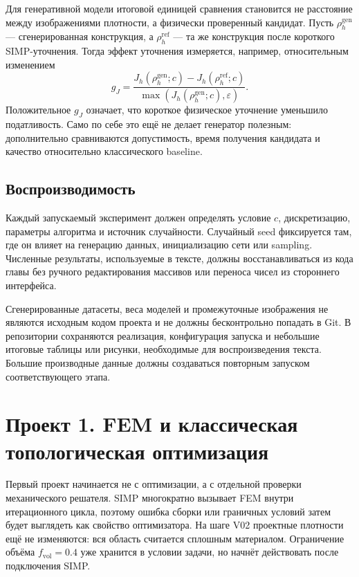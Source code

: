 Для генеративной модели итоговой единицей сравнения становится не расстояние между изображениями плотности, а физически проверенный кандидат. Пусть $\rho_h^{\mathrm{gen}}$ --- сгенерированная конструкция, а $\rho_h^{\mathrm{ref}}$ --- та же конструкция после короткого SIMP-уточнения. Тогда эффект уточнения измеряется, например, относительным изменением
\begin{equation}
\label{eq:practical-refinement-gain}
 g_J
 =
 \frac{
 J_h(\rho_h^{\mathrm{gen}};c)
 -
 J_h(\rho_h^{\mathrm{ref}};c)
 }{
 \max(J_h(\rho_h^{\mathrm{gen}};c),\varepsilon)
 }.
\end{equation}
Положительное $g_J$ означает, что короткое физическое уточнение уменьшило податливость. Само по себе это ещё не делает генератор полезным: дополнительно сравниваются допустимость, время получения кандидата и качество относительно классического baseline.

\subsection{Воспроизводимость}

Каждый запускаемый эксперимент должен определять условие $c$, дискретизацию, параметры алгоритма и источник случайности. Случайный seed фиксируется там, где он влияет на генерацию данных, инициализацию сети или sampling. Численные результаты, используемые в тексте, должны восстанавливаться из кода главы без ручного редактирования массивов или переноса чисел из стороннего интерфейса.

Сгенерированные датасеты, веса моделей и промежуточные изображения не являются исходным кодом проекта и не должны бесконтрольно попадать в Git. В репозитории сохраняются реализация, конфигурация запуска и небольшие итоговые таблицы или рисунки, необходимые для воспроизведения текста. Большие производные данные должны создаваться повторным запуском соответствующего этапа.

\section{Проект 1. FEM и классическая топологическая оптимизация}
\label{sec:practical-project-fem-simp}

Первый проект начинается не с оптимизации, а с отдельной проверки механического решателя. SIMP многократно вызывает FEM внутри итерационного цикла, поэтому ошибка сборки или граничных условий затем будет выглядеть как свойство оптимизатора. На шаге V02 проектные плотности ещё не изменяются: вся область считается сплошным материалом. Ограничение объёма $f_{\mathrm{vol}}=0.4$ уже хранится в условии задачи, но начнёт действовать после подключения SIMP.

